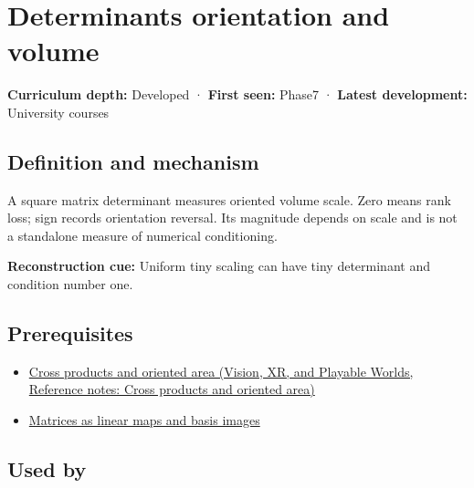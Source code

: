 \hypertarget{appendix-da478be01d02}{}\label{referencestart:appendix-da478be01d02}
\section{Determinants orientation and volume}\label{appendix-da478be01d02-determinants-orientation-and-volume}

\hypertarget{appendix-da478be01d02-determinants-orientation-and-volume}{}

\textbf{Curriculum depth:} Developed · \textbf{First seen:} Phase7 · \textbf{Latest development:} University courses

\begin{allmightroledefinition}

\subsection{Definition and mechanism}\label{appendix-da478be01d02-definition-and-mechanism}

\hypertarget{appendix-da478be01d02-definition-and-mechanism}{}

A square matrix determinant measures oriented volume scale. Zero means rank loss; sign records orientation reversal. Its magnitude depends on scale and is not a standalone measure of numerical conditioning.

\end{allmightroledefinition}

\textbf{Reconstruction cue:} Uniform tiny scaling can have tiny determinant and condition number one.

\subsection{Prerequisites}\label{appendix-da478be01d02-prerequisites}

\hypertarget{appendix-da478be01d02-prerequisites}{}

\begin{itemize}
\tightlist
\item
  \href{../07-Vision-XR-and-Playable-Worlds/main.pdf\#nameddest=appendix-2391db8052b1}{Cross products and oriented area (Vision, XR, and Playable Worlds, Reference notes: Cross products and oriented area)}
\item
  \hyperref[appendix-bd39c3bf5d64]{Matrices as linear maps and basis images}
\end{itemize}

\subsection{Used by}\label{appendix-da478be01d02-used-by}


